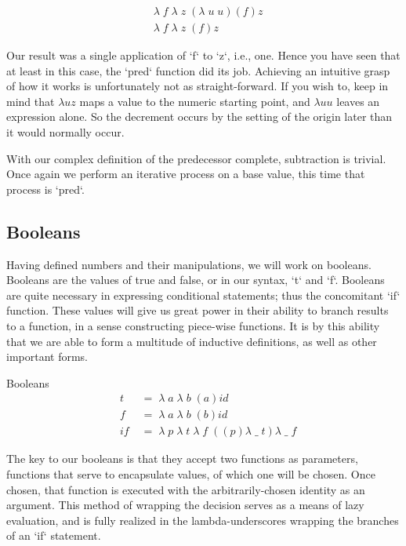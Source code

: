 \begin{align*}
& \lambda \; f \; \lambda \; z \; (\lambda \; u \; u)(f)z
\\& \lambda \; f \; \lambda \; z \; (f)z
\end{align*}

Our result was a single application of `f` to `z`, i.e., one. Hence you have seen 
that at least in this case, the `pred` function did its job. Achieving an
intuitive grasp of how it works is unfortunately not as straight-forward. If you
wish to, keep in mind that $\lambda u z$ maps a value to the numeric starting
point, and $\lambda u u$ leaves an expression alone. So the decrement occurs by
the setting of the origin later than it would normally occur.

With our complex definition of the predecessor complete, subtraction is trivial.
Once again we perform an iterative process on a base value, this time that process 
is `pred`.

\subsection{Booleans}
Having defined numbers and their manipulations, we will work on booleans. Booleans 
are the values of true and false, or in our syntax, `t` and `f`. Booleans are
quite necessary in expressing conditional statements; thus the concomitant `if`
function. These values will give us great power in their ability to branch results 
to a function, in a sense constructing piece-wise functions. It is by this ability 
that we are able to form a multitude of inductive definitions, as well as other 
important forms.

Booleans
\begin{align*}
& t \; &= \; \lambda \; a \; \lambda \; b \; (a)id
\\& f \; &= \; \lambda \; a \; \lambda \; b \; (b)id
\\& if \; &= \; \lambda \; p \; \lambda \; t \; \lambda \; f \; ((p)\lambda \; \_ \; t)\lambda \; \_ \; f
\end{align*}

The key to our booleans is that they accept two functions as parameters, functions 
that serve to encapsulate values, of which one will be chosen. Once chosen, that 
function is executed with the arbitrarily-chosen identity as an argument. This
method of wrapping the decision serves as a means of lazy evaluation, and is fully 
realized in the lambda-underscores wrapping the branches of an `if` statement.

